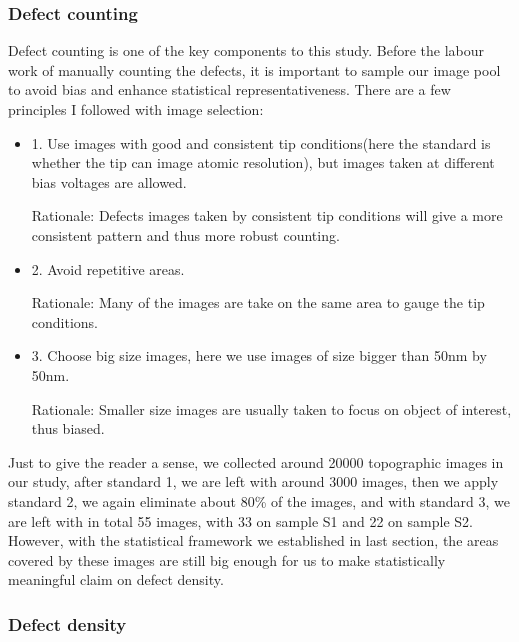 \subsubsection{Defect counting}
Defect counting is one of the key components to this study. Before the labour work of manually counting the defects, it is important to sample our image pool to avoid bias and enhance statistical representativeness. There are a few principles I followed with image selection: 
\begin{itemize}
	\item 1. Use images with good and consistent tip conditions(here the standard is whether the tip can image atomic resolution), but images taken at different bias voltages are allowed. 
	\par Rationale: Defects images taken by consistent tip conditions will give a more consistent pattern and thus more robust counting.	
	\item 2. Avoid repetitive areas. 
	\par Rationale: Many of the images are take on the same area to gauge the tip conditions.
	\item 3. Choose big size images, here we use images of size bigger than 50nm by 50nm.
	\par Rationale: Smaller size images are usually taken to focus on object of interest, thus biased.  
\end{itemize}  
Just to give the reader a sense, we collected around 20000 topographic images in our study, after standard 1, we are left with around 3000 images, then we apply standard 2, we again eliminate about 80\% of the images, and with standard 3, we are left with in total 55 images, with 33 on sample S1 and 22 on sample S2. However, with the statistical framework we established in last section, the areas covered by these images are still big enough for us to make statistically meaningful claim on defect density.

\subsubsection{Defect density}

